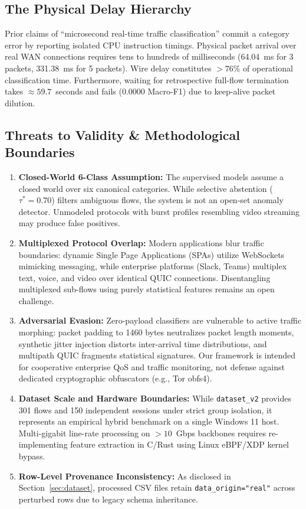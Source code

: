 \documentclass[conference]{IEEEtran}
\begin{document}
\subsection{The Physical Delay Hierarchy}
Prior claims of ``microsecond real-time traffic classification'' commit a category error by reporting isolated CPU instruction timings. Physical packet arrival over real WAN connections requires tens to hundreds of milliseconds (64.04~ms for 3 packets, 331.38~ms for 5 packets). Wire delay constitutes $>76\%$ of operational classification time. Furthermore, waiting for retrospective full-flow termination takes $\approx 59.7$~seconds and fails (0.0000 Macro-F1) due to keep-alive packet dilution.

\subsection{Threats to Validity \& Methodological Boundaries}
\begin{enumerate}
    \item \textbf{Closed-World 6-Class Assumption:} The supervised models assume a closed world over six canonical categories. While selective abstention ($\tau^* = 0.70$) filters ambiguous flows, the system is not an open-set anomaly detector. Unmodeled protocols with burst profiles resembling video streaming may produce false positives.
    \item \textbf{Multiplexed Protocol Overlap:} Modern applications blur traffic boundaries: dynamic Single Page Applications (SPAs) utilize WebSockets mimicking messaging, while enterprise platforms (Slack, Teams) multiplex text, voice, and video over identical QUIC connections. Disentangling multiplexed sub-flows using purely statistical features remains an open challenge.
    \item \textbf{Adversarial Evasion:} Zero-payload classifiers are vulnerable to active traffic morphing: packet padding to 1460 bytes neutralizes packet length moments, synthetic jitter injection distorts inter-arrival time distributions, and multipath QUIC fragments statistical signatures. Our framework is intended for cooperative enterprise QoS and traffic monitoring, not defense against dedicated cryptographic obfuscators (e.g., Tor obfs4).
    \item \textbf{Dataset Scale and Hardware Boundaries:} While \texttt{dataset\_v2} provides 301 flows and 150 independent sessions under strict group isolation, it represents an empirical hybrid benchmark on a single Windows 11 host. Multi-gigabit line-rate processing on $>10$~Gbps backbones requires re-implementing feature extraction in C/Rust using Linux eBPF/XDP kernel bypass.
    \item \textbf{Row-Level Provenance Inconsistency:} As disclosed in Section~\ref{sec:dataset}, processed CSV files retain \texttt{data\_origin="real"} across perturbed rows due to legacy schema inheritance.
\end{enumerate}
\end{document}
